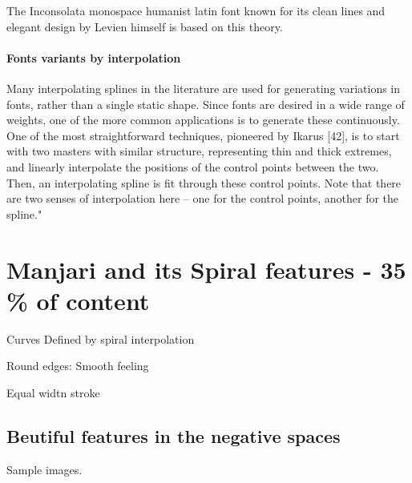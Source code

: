 \documentclass[10pt]{article}
\begin{document}
The Inconsolata monospace humanist latin font known for its clean lines and elegant design by Levien himself is based on this theory.

\paragraph{Fonts variants by interpolation}
Many interpolating splines in the literature are used for generating variations in fonts, rather
than a single static shape. Since fonts are desired in a wide range of weights, one of the more
common applications is to generate these continuously. One of the most straightforward techniques,
pioneered by Ikarus [42], is to start with two masters with similar structure, representing thin
and thick extremes, and linearly interpolate the positions of the control points between the two.
Then, an interpolating spline is fit through these control points. Note that there are two senses of
interpolation here – one for the control points, another for the spline." \cite{lamport94}


\section{Manjari and its Spiral features - 35 \% of content}

Curves Defined by spiral interpolation

Round edges: Smooth feeling

Equal widtn stroke

\subsection{Beutiful features in the negative spaces}

Sample images.
\end{document}

